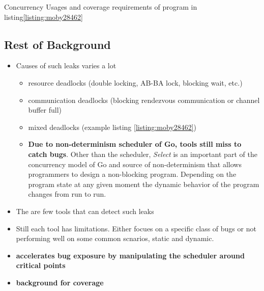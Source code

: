 \begin{table}[]
\centering
\caption{Concurrency Usages and coverage requirements of program in listing\ref{listing:moby28462}}
\scalebox{0.9}{

}
\label{tab:moby_cov_table}
\end{table}

\subsection{Rest of Background}
\begin{itemize}
  \item Causes of such leaks varies a lot
  \begin{itemize}
    \item resource deadlocks (double locking, AB-BA lock, blocking wait, etc.)
    \item communication deadlocks (blocking rendezvous communication or channel buffer full)
    \item mixed deadlocks (example listing \ref{listing:moby28462})
    \item \textbf{Due to non-determinism scheduler of Go, tools still miss to catch bugs}. Other than the scheduler, \textit{Select} is an important part of the concurrency model of Go and source of non-determinism that allows programmers to design a non-blocking program. Depending on the program state at any given moment the dynamic behavior of the program changes from run to run.
  \end{itemize}
  \item The are few tools that can detect such leaks
  \item Still each tool has limitations. Either focues on a specific class of bugs or not performing well on some common scnarios, static and dynamic.
  \item \textbf{\goat accelerates bug exposure by manipulating the scheduler around critical points}
  \item \textbf{background for coverage}
\end{itemize}







